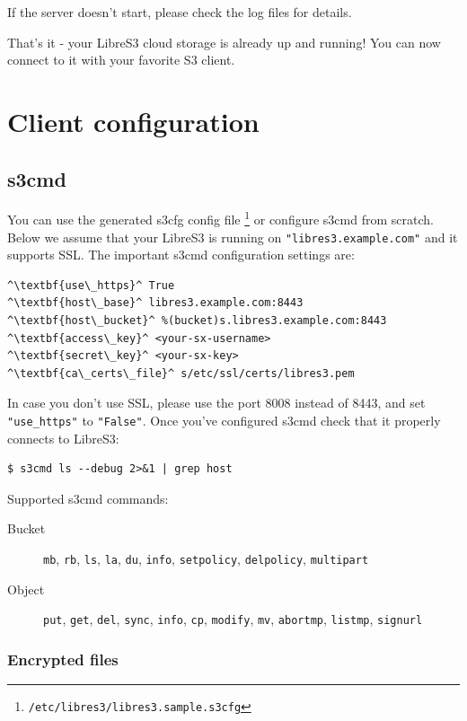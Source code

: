 If the server doesn't start, please check the log files for details.

That's it - your LibreS3 cloud storage is already up and running!
You can now connect to it with your favorite S3 client.

\chapter{Client configuration}
\section{s3cmd}

You can use the generated s3cfg config file
\footnote{\verb|/etc/libres3/libres3.sample.s3cfg|}
 or configure s3cmd from scratch.
Below we assume that your LibreS3
is running on \verb|"libres3.example.com"| and it supports SSL.
The important s3cmd configuration settings are:

\begin{lstlisting}
^\textbf{use\_https}^ True
^\textbf{host\_base}^ libres3.example.com:8443
^\textbf{host\_bucket}^ %(bucket)s.libres3.example.com:8443
^\textbf{access\_key}^ <your-sx-username>
^\textbf{secret\_key}^ <your-sx-key>
^\textbf{ca\_certs\_file}^ s/etc/ssl/certs/libres3.pem
\end{lstlisting}


In case you don't use SSL, please use the port 8008 instead of 8443, and set
\verb|"use_https"| to \verb|"False"|. Once you've configured s3cmd check
that it properly connects to LibreS3:

\begin{lstlisting}
$ s3cmd ls --debug 2>&1 | grep host
\end{lstlisting}


Supported s3cmd commands:
\begin{description}
    \item[Bucket] \verb|mb|, \verb|rb|, \verb|ls|, \verb|la|, \verb|du|, \verb|info|,
		\verb|setpolicy|, \verb|delpolicy|,
		\verb|multipart|
    \item[Object] \verb|put|, \verb|get|, \verb|del|, \verb|sync|, \verb|info|,
        \verb|cp|, \verb|modify|, \verb|mv|, \verb|abortmp|, \verb|listmp|,
        \verb|signurl|
        
\end{description}

\subsection{Encrypted files}

